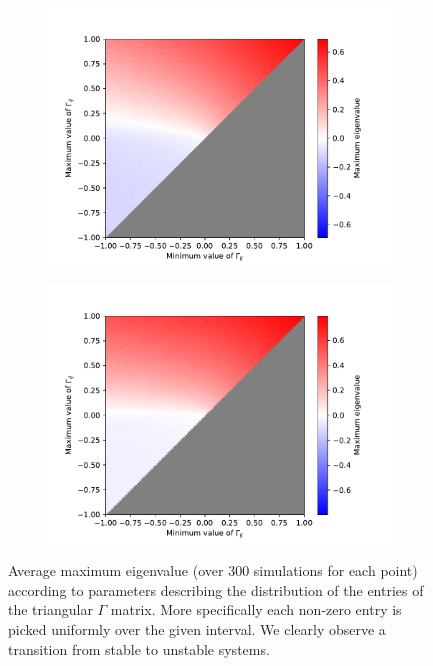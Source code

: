 \documentclass[12pt, titlepage]{report}
\begin{document}
		\begin{figure}
			\centering
			\begin{subfigure}{0.49\textwidth}
				\includegraphics[width=\linewidth]{mean_maximum_eigval_wrto_Gamma_NR=3.pdf}
			\end{subfigure}
			\hfill
			\begin{subfigure}{0.49\textwidth}
				\includegraphics[width=\linewidth]{mean_maximum_eigval_wrto_Gamma_NR=8.pdf}
			\end{subfigure}
			\caption{Average maximum eigenvalue (over 300 simulations for each point) according to parameters describing the distribution of the entries of the triangular $\Gamma$ matrix. More specifically each non-zero entry is picked uniformly over the given interval. We clearly observe a transition from stable to unstable systems.} \label{fig : mean max eigenvalue}
		\end{figure}
\end{document}
